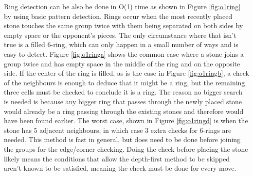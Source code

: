 Ring detection can be also be done in O(1) time as shown in Figure \ref{fig:o1ring} by using basic pattern detection. Rings occur when the most recently placed stone touches the same group twice with them being separated on both sides by empty space or the opponent's pieces. The only circumstance where that isn't true is a filled 6-ring, which can only happen in a small number of ways and is easy to detect. Figure \ref{fig:o1ringa} shows the common case where a stone joins a group twice and has empty space in the middle of the ring and on the opposite side. If the center of the ring is filled, as is the case in Figure \ref{fig:o1ringb}, a check of the neighbours is enough to deduce that it might be a ring, but the remaining three cells must be checked to conclude it is a ring. The reason no bigger search is needed is because any bigger ring that passes through the newly placed stone would already be a ring passing through the existing stones and therefore would have been found earlier. The worst case, shown in Figure \ref{fig:o1ringd} is when the stone has 5 adjacent neighbours, in which case 3 extra checks for 6-rings are needed. This method is fast in general, but does need to be done before joining the groups for the edge/corner checking. Doing the check before placing the stone likely means the conditions that allow the depth-first method to be skipped aren't known to be satisfied, meaning the check must be done for every move.

